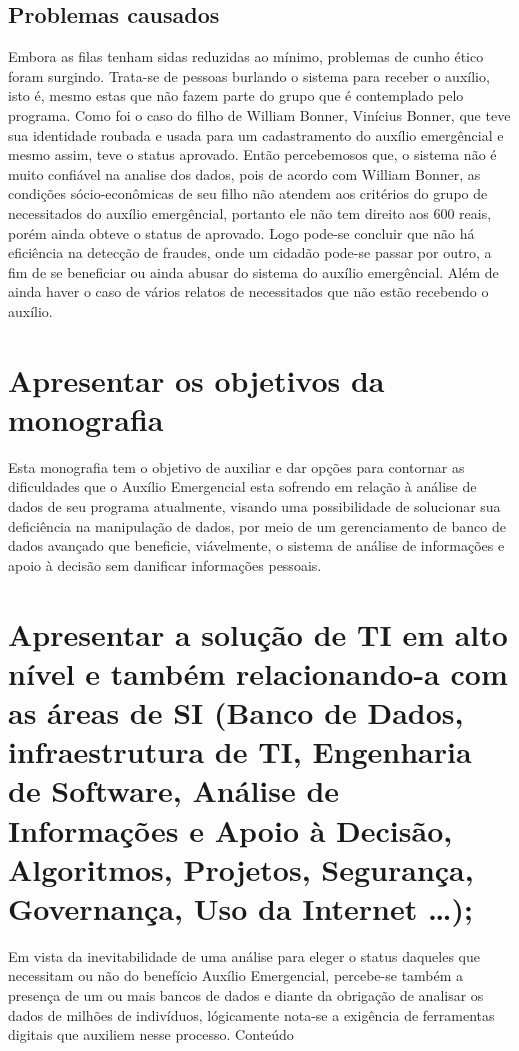 \documentclass[12pt]{article}
\begin{document}
\subsection{Problemas causados}
	Embora as filas tenham sidas reduzidas ao mínimo, problemas de cunho ético foram surgindo. Trata-se de pessoas burlando o sistema para receber o auxílio, isto é, mesmo estas que não fazem parte do grupo que é contemplado pelo programa. Como foi o caso do filho de William Bonner, Vinícius Bonner, que teve sua identidade roubada e usada para um cadastramento do auxílio emergêncial e mesmo assim, teve o status aprovado.
\linebreak
\linebreak
	Então percebemosos que, o sistema não é muito confiável na analise dos dados, pois de acordo com William Bonner, as condições sócio-econômicas de seu filho não atendem aos critérios do grupo de necessitados do auxílio emergêncial, portanto ele não tem direito aos 600 reais, porém ainda obteve o status de aprovado. Logo pode-se concluir que não há eficiência na detecção de fraudes, onde um cidadão pode-se passar por outro, a fim de se beneficiar ou ainda abusar do sistema do auxílio emergêncial. Além de ainda haver o caso de vários relatos de necessitados que não estão recebendo o auxílio.
\section{Apresentar os objetivos da monografia}
	Esta monografia tem o objetivo de auxiliar e dar opções para contornar as dificuldades que o Auxílio Emergencial esta sofrendo em relação à análise de dados de seu programa atualmente, visando uma possibilidade de solucionar sua deficiência na manipulação de dados, por meio de um gerenciamento de banco de dados avançado que beneficie, viávelmente, o sistema de análise de informações e apoio à decisão sem danificar informações pessoais.

\section{Apresentar a solução de TI em alto nível e também relacionando-a com as áreas de SI (Banco de Dados, infraestrutura de TI, Engenharia de Software, Análise de Informações e Apoio à Decisão, Algoritmos, Projetos, Segurança, Governança, Uso da Internet …);}
	Em vista da inevitabilidade de uma análise para eleger o status daqueles que necessitam ou não do benefício Auxílio Emergencial, percebe-se também a presença de um ou mais bancos de dados e diante da obrigação de analisar os dados de milhões de indivíduos, lógicamente nota-se a exigência de ferramentas digitais que auxiliem nesse processo.
\linebreak
\linebreak
Conteúdo
\end{document}
